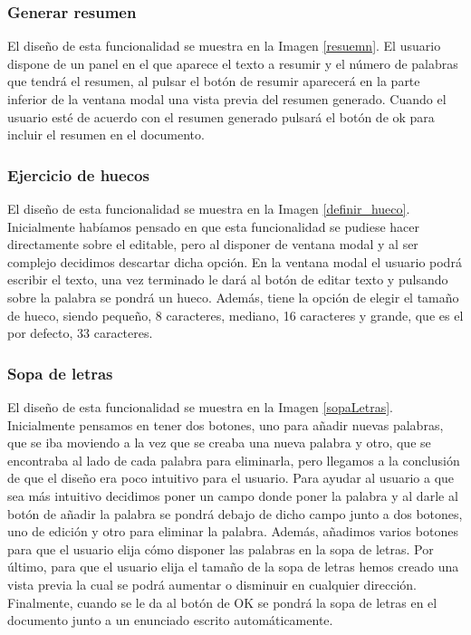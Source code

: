 \subsubsection{Generar resumen}
El diseño de esta funcionalidad se muestra en la Imagen \ref{resuemn}. El usuario dispone de un panel en el que aparece el texto a resumir y el número de palabras que tendrá el resumen, al pulsar el botón de resumir aparecerá en la parte inferior de la ventana modal una vista previa del resumen generado. Cuando el usuario esté de acuerdo con el resumen generado pulsará el botón de ok para incluir el resumen en el documento.

\subsubsection{Ejercicio de huecos}
El diseño de esta funcionalidad se muestra en la Imagen \ref{definir_hueco}. Inicialmente habíamos pensado en que esta funcionalidad se pudiese hacer directamente sobre el editable, pero al disponer de ventana modal y al ser complejo decidimos descartar dicha opción. En la ventana modal el usuario podrá escribir el texto, una vez terminado le dará al botón de editar texto y pulsando sobre la palabra se pondrá un hueco. Además, tiene la opción de elegir el tamaño de hueco, siendo pequeño, 8 caracteres, mediano, 16 caracteres y grande, que es el por defecto, 33 caracteres.  

\subsubsection{Sopa de letras}
El diseño de esta funcionalidad se muestra en la Imagen \ref{sopaLetras}. Inicialmente pensamos en tener dos botones, uno para añadir nuevas palabras, que se iba moviendo a la vez que se creaba una nueva palabra y otro, que se encontraba al lado de cada palabra para eliminarla, pero llegamos a la conclusión de que el diseño era poco intuitivo para el usuario. Para ayudar al usuario a que sea más intuitivo decidimos poner un campo donde poner la palabra y al darle al botón de añadir la palabra se pondrá debajo de dicho campo junto a dos botones, uno de edición y otro para eliminar la palabra. Además, añadimos varios botones para que el usuario elija cómo disponer las palabras en la sopa de letras. Por último, para que el usuario elija el tamaño de la sopa de letras hemos creado una vista previa la cual se podrá aumentar o disminuir en cualquier dirección. Finalmente, cuando se le da al botón de OK se pondrá la sopa de letras en el documento junto a un enunciado escrito automáticamente. 

